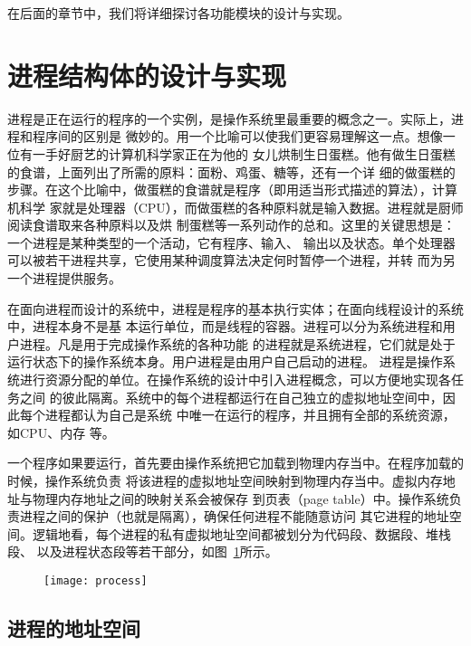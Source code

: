\documentclass{swfuthesism}
\begin{document}
在后面的章节中，我们将详细探讨各功能模块的设计与实现。

\section{进程结构体的设计与实现}

进程是正在运行的程序的一个实例，是操作系统里最重要的概念之一。实际上，进程和程序间的区别是
微妙的。用一个比喻可以使我们更容易理解这一点。想像一位有一手好厨艺的计算机科学家正在为他的
女儿烘制生日蛋糕。他有做生日蛋糕的食谱，上面列出了所需的原料：面粉、鸡蛋、糖等，还有一个详
细的做蛋糕的步骤。在这个比喻中，做蛋糕的食谱就是程序（即用适当形式描述的算法），计算机科学
家就是处理器（CPU），而做蛋糕的各种原料就是输入数据。进程就是厨师阅读食谱取来各种原料以及烘
制蛋糕等一系列动作的总和。这里的关键思想是：一个进程是某种类型的一个活动，它有程序、输入、
输出以及状态。单个处理器可以被若干进程共享，它使用某种调度算法决定何时暂停一个进程，并转
而为另一个进程提供服务\cite{linuxjournal:process}。

在面向进程而设计的系统中，进程是程序的基本执行实体；在面向线程设计的系统中，进程本身不是基
本运行单位，而是线程的容器。进程可以分为系统进程和用户进程。凡是用于完成操作系统的各种功能
的进程就是系统进程，它们就是处于运行状态下的操作系统本身。用户进程是由用户自己启动的进程。
进程是操作系统进行资源分配的单位。在操作系统的设计中引入进程概念，可以方便地实现各任务之间
的彼此隔离。系统中的每个进程都运行在自己独立的虚拟地址空间中，因此每个进程都认为自己是系统
中唯一在运行的程序，并且拥有全部的系统资源，如CPU、内存
等\cite{Bryant2010computersystems,silberschatz11essentials}。

一个程序如果要运行，首先要由操作系统把它加载到物理内存当中。在程序加载的时候，操作系统负责
将该进程的虚拟地址空间映射到物理内存当中。虚拟内存地址与物理内存地址之间的映射关系会被保存
到页表（page table）中。操作系统负责进程之间的保护（也就是隔离），确保任何进程不能随意访问
其它进程的地址空间。逻辑地看，每个进程的私有虚拟地址空间都被划分为代码段、数据段、堆栈段、
以及进程状态段等若干部分，如图~\ref{fig:process}所示。

\begin{figure}[!htb]
  \centering
  \texttt{[image: process]}
  \label{fig:process}
\end{figure}

\subsection{进程的地址空间}\label{sec:procvm}
\end{document}
